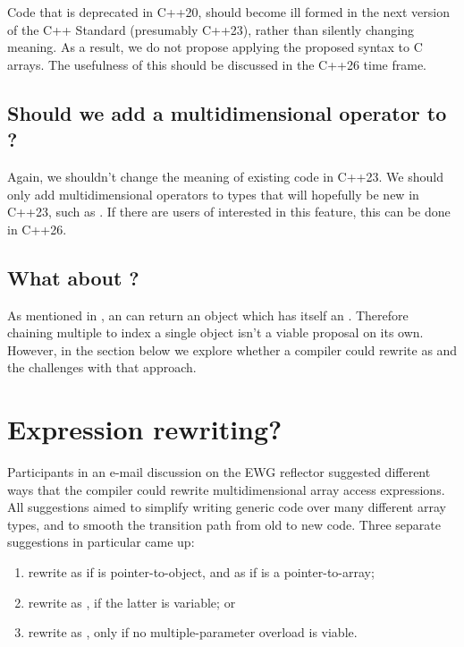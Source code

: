 \documentclass{wg21}
\begin{document}
Code that is deprecated in C++20, should become ill formed in the next version of the C++ Standard (presumably C++23),
rather than silently changing meaning.
As a result, we do not propose applying the proposed syntax to C arrays.
The usefulness of this should be discussed in the C++26 time frame.

\subsection{Should we add a multidimensional operator to ?}

Again, we shouldn't change the meaning of existing code in C++23.
We should only add multidimensional operators to types that will hopefully be new in C++23, such as .
If there are users of  interested in this feature, this can be done in C++26.

\subsection{What about \tcode{[foo][bar]}?}

As mentioned in , an  can return an object which has itself an .
Therefore chaining multiple \tcode{[]} to index a single object isn't a viable proposal on its own.
However, in the section below we explore whether a compiler could rewrite  as 
and the challenges with that approach.

\section{Expression rewriting?}

Participants in an e-mail discussion on the EWG reflector suggested different ways that the compiler could rewrite multidimensional array access expressions.  All suggestions aimed to simplify writing generic code over many different array types, and to smooth the transition path from old to new code.  Three separate suggestions in particular came up:

\begin{enumerate}
\item rewrite  as  if  is pointer-to-object, and  as  if  is a pointer-to-array;
\item rewrite  as , if the latter is variable; or
\item rewrite  as , only if no multiple-parameter  overload is viable.
\end{enumerate}
\end{document}

